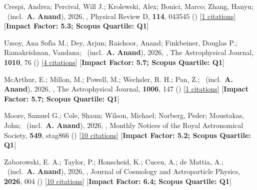 \item[{\color{numcolor}\scriptsize29}] Crespi, Andrea; Percival, Will J.; Krolewski, Alex; Bonici, Marco; Zhang, Hanyu; \etal\ (incl.\ \textbf{A. Anand}), 2026, , Physical Review D, \textbf{114}, 043545 () [\href{https://ui.adsabs.harvard.edu/abs/2026PhRvD.114d3545C}{1 citations}] [\textbf{Impact Factor: 5.3; Scopus Quartile: Q1}]

\item[{\color{numcolor}\scriptsize28}] Uzsoy, Ana Sof{\'\i}a M.; Dey, Arjun; Raichoor, Anand; Finkbeiner, Douglas P.; Ramakrishnan, Vandana; \etal\ (incl.\ \textbf{A. Anand}), 2026, , The Astrophysical Journal, \textbf{1010}, 76 () [\href{https://ui.adsabs.harvard.edu/abs/2026ApJ..1010...76U}{4 citations}] [\textbf{Impact Factor: 5.7; Scopus Quartile: Q1}]

\item[{\color{numcolor}\scriptsize27}] McArthur, E.; Millon, M.; Powell, M.; Wechsler, R. H.; Pan, Z.; \etal\ (incl.\ \textbf{A. Anand}), 2026, , The Astrophysical Journal, \textbf{1006}, 147 () [\href{https://ui.adsabs.harvard.edu/abs/2026ApJ..1006..147M}{1 citations}] [\textbf{Impact Factor: 5.7; Scopus Quartile: Q1}]

\item[{\color{numcolor}\scriptsize26}] Moore, Samuel G.; Cole, Shaun; Wilson, Michael; Norberg, Peder; Moustakas, John; \etal\ (incl.\ \textbf{A. Anand}), 2026, , Monthly Notices of the Royal Astronomical Society, \textbf{549}, stag866 () [\href{https://ui.adsabs.harvard.edu/abs/2026MNRAS.549ag866M}{10 citations}] [\textbf{Impact Factor: 5.2; Scopus Quartile: Q1}]

\item[{\color{numcolor}\scriptsize25}] Zaborowski, E. A.; Taylor, P.; Honscheid, K.; Cuceu, A.; de Mattia, A.; \etal\ (incl.\ \textbf{A. Anand}), 2026, , Journal of Cosmology and Astroparticle Physics, \textbf{2026}, 004 () [\href{https://ui.adsabs.harvard.edu/abs/2026JCAP...04..004Z}{10 citations}] [\textbf{Impact Factor: 6.4; Scopus Quartile: Q1}]

